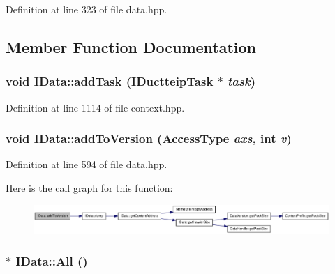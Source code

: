 Definition at line 323 of file data.hpp.

\subsection{Member Function Documentation}
\hypertarget{class_i_data_a305f24b50e8e46c4cc3722954e2be4c6}{
\subsubsection[{addTask}]{\setlength{\rightskip}{0pt plus 5cm}void IData::addTask ({\bf IDuctteipTask} $\ast$ {\em task})}}
\label{class_i_data_a305f24b50e8e46c4cc3722954e2be4c6}


Definition at line 1114 of file context.hpp.\hypertarget{class_i_data_afd0e370c302dddc1983eece576059a80}{
\subsubsection[{addToVersion}]{\setlength{\rightskip}{0pt plus 5cm}void IData::addToVersion ({\bf AccessType} {\em axs}, \/  int {\em v})}}
\label{class_i_data_afd0e370c302dddc1983eece576059a80}


Definition at line 594 of file data.hpp.

Here is the call graph for this function:\nopagebreak
\begin{figure}[H]
\begin{center}
\leavevmode
\includegraphics[width=420pt]{class_i_data_afd0e370c302dddc1983eece576059a80_cgraph}
\end{center}
\end{figure}
\hypertarget{class_i_data_aee2a0f1d0d749dc8a2380e4ae5e84c62}{
\subsubsection[{All}]{$\ast$ IData::All ()}}
\label{class_i_data_aee2a0f1d0d749dc8a2380e4ae5e84c62}


